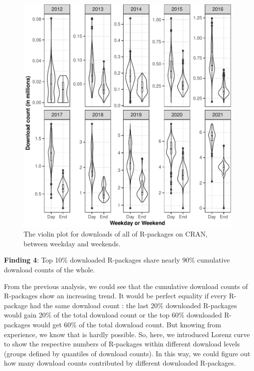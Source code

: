 \documentclass[
]{book}
\newenvironment{discovery}[1]{%
  \begin{tcolorbox}[colback=blue!30,colframe=blue!80!black]#1}{\end{tcolorbox}}
\begin{document}
\begin{figure}

{\centering \includegraphics{figures/weekend-vs-weekday-1} 

}

\caption{The violin plot for downloads of all of R-packages on CRAN, between weekday and weekends.}\label{fig:weekend-vs-weekday}
\end{figure}

\begin{discovery}
\textbf{Finding 4}: Top 10\% downloaded R-packages share nearly 90\%
cumulative download counts of the whole.
\end{discovery}

From the previous analysis, we could see that the cumulative download counts of R-packages show an increasing trend. It would be perfect equality if every R-package had the same download count : the last 20\% downloaded R-packages would gain 20\% of the total download count or the top 60\% downloaded R-packages would get 60\% of the total download count. But knowing from experience, we know that is hardly possible. So, here, we introduced Lorenz curve\citep{lorenz} to show the respective numbers of R-packages within different download levels (groups defined by quantiles of download counts). In this way, we could figure out how many download counts contributed by different downloaded R-packages.
\end{document}
